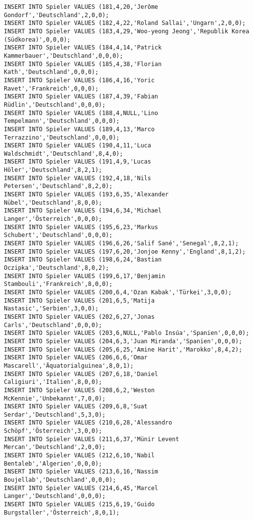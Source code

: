 \documentclass{lehramt-informatik-aufgabe}
\begin{document}
\begin{verbatim}
INSERT INTO Spieler VALUES (181,4,20,'Jerôme Gondorf','Deutschland',2,0,0);
INSERT INTO Spieler VALUES (182,4,22,'Roland Sallai','Ungarn',2,0,0);
INSERT INTO Spieler VALUES (183,4,29,'Woo-yeong Jeong','Republik Korea (Südkorea)',0,0,0);
INSERT INTO Spieler VALUES (184,4,14,'Patrick Kammerbauer','Deutschland',0,0,0);
INSERT INTO Spieler VALUES (185,4,38,'Florian Kath','Deutschland',0,0,0);
INSERT INTO Spieler VALUES (186,4,16,'Yoric Ravet','Frankreich',0,0,0);
INSERT INTO Spieler VALUES (187,4,39,'Fabian Rüdlin','Deutschland',0,0,0);
INSERT INTO Spieler VALUES (188,4,NULL,'Lino Tempelmann','Deutschland',0,0,0);
INSERT INTO Spieler VALUES (189,4,13,'Marco Terrazzino','Deutschland',0,0,0);
INSERT INTO Spieler VALUES (190,4,11,'Luca Waldschmidt','Deutschland',8,4,0);
INSERT INTO Spieler VALUES (191,4,9,'Lucas Höler','Deutschland',8,2,1);
INSERT INTO Spieler VALUES (192,4,18,'Nils Petersen','Deutschland',8,2,0);
INSERT INTO Spieler VALUES (193,6,35,'Alexander Nübel','Deutschland',8,0,0);
INSERT INTO Spieler VALUES (194,6,34,'Michael Langer','Österreich',0,0,0);
INSERT INTO Spieler VALUES (195,6,23,'Markus Schubert','Deutschland',0,0,0);
INSERT INTO Spieler VALUES (196,6,26,'Salif Sané','Senegal',8,2,1);
INSERT INTO Spieler VALUES (197,6,20,'Jonjoe Kenny','England',8,1,2);
INSERT INTO Spieler VALUES (198,6,24,'Bastian Oczipka','Deutschland',8,0,2);
INSERT INTO Spieler VALUES (199,6,17,'Benjamin Stambouli','Frankreich',8,0,0);
INSERT INTO Spieler VALUES (200,6,4,'Ozan Kabak','Türkei',3,0,0);
INSERT INTO Spieler VALUES (201,6,5,'Matija Nastasic','Serbien',3,0,0);
INSERT INTO Spieler VALUES (202,6,27,'Jonas Carls','Deutschland',0,0,0);
INSERT INTO Spieler VALUES (203,6,NULL,'Pablo Insúa','Spanien',0,0,0);
INSERT INTO Spieler VALUES (204,6,3,'Juan Miranda','Spanien',0,0,0);
INSERT INTO Spieler VALUES (205,6,25,'Amine Harit','Marokko',8,4,2);
INSERT INTO Spieler VALUES (206,6,6,'Omar Mascarell','Äquatorialguinea',8,0,1);
INSERT INTO Spieler VALUES (207,6,18,'Daniel Caligiuri','Italien',8,0,0);
INSERT INTO Spieler VALUES (208,6,2,'Weston McKennie','Unbekannt',7,0,0);
INSERT INTO Spieler VALUES (209,6,8,'Suat Serdar','Deutschland',5,3,0);
INSERT INTO Spieler VALUES (210,6,28,'Alessandro Schöpf','Österreich',3,0,0);
INSERT INTO Spieler VALUES (211,6,37,'Münir Levent Mercan','Deutschland',2,0,0);
INSERT INTO Spieler VALUES (212,6,10,'Nabil Bentaleb','Algerien',0,0,0);
INSERT INTO Spieler VALUES (213,6,16,'Nassim Boujellab','Deutschland',0,0,0);
INSERT INTO Spieler VALUES (214,6,45,'Marcel Langer','Deutschland',0,0,0);
INSERT INTO Spieler VALUES (215,6,19,'Guido Burgstaller','Österreich',8,0,1);

\end{verbatim}
\end{document}
